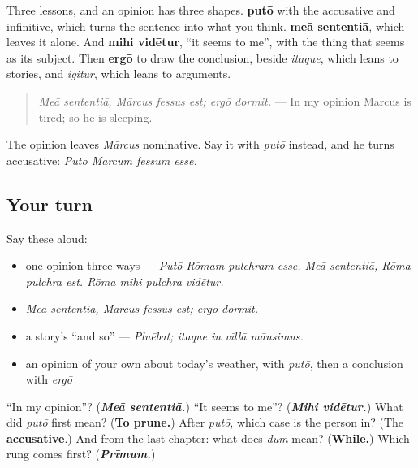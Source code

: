 \begin{grammarlens}[title={What you've built}]
Three lessons, and an opinion has three shapes. \textbf{putō} with the accusative and infinitive, which turns the sentence into what you think. \textbf{meā sententiā}, which leaves it alone. And \textbf{mihi vidētur}, \textquotedblleft{}it seems to me\textquotedblright{}, with the thing that seems as its subject. Then \textbf{ergō} to draw the conclusion, beside \emph{itaque}, which leans to stories, and \emph{igitur}, which leans to arguments.

\begin{quote}
\emph{Meā sententiā, Mārcus fessus est; ergō dormit.} — In my opinion Marcus is tired; so he is sleeping.
\end{quote}

The opinion leaves \emph{Mārcus} nominative. Say it with \emph{putō} instead, and he turns accusative: \emph{Putō Mārcum fessum esse.}
\end{grammarlens}

\subsection*{Your turn}
Say these aloud:

\begin{itemize}
\raggedright
  \item one opinion three ways — \emph{Putō Rōmam pulchram esse. Meā sententiā, Rōma pulchra est. Rōma mihi pulchra vidētur.}
  \item \emph{Meā sententiā, Mārcus fessus est; ergō dormit.}
  \item a story's \textquotedblleft{}and so\textquotedblright{} — \emph{Pluēbat; itaque in vīllā mānsimus.}
  \item an opinion of your own about today's weather, with \emph{putō}, then a conclusion with \emph{ergō}
\end{itemize}

\begin{tcolorbox}[breakable,colback=teal!4,colframe=teal!35!black,title={Before you move on}]
\textquotedblleft{}In my opinion\textquotedblright{}? (\emph{\textbf{Meā sententiā.}}) \textquotedblleft{}It seems to me\textquotedblright{}? (\emph{\textbf{Mihi vidētur.}}) What did \emph{putō} first mean? (\textbf{To prune.}) After \emph{putō}, which case is the person in? (The \textbf{accusative}.) And from the last chapter: what does \emph{dum} mean? (\textbf{While.}) Which rung comes first? (\emph{\textbf{Prīmum.}})
\end{tcolorbox}
